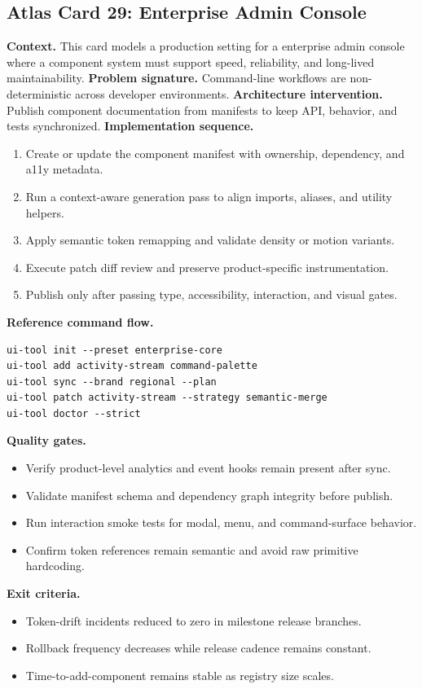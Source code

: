\subsection*{Atlas Card 29: Enterprise Admin Console}
\textbf{Context.} This card models a production setting for a enterprise admin console where a component system must support speed, reliability, and long-lived maintainability.
\textbf{Problem signature.} Command-line workflows are non-deterministic across developer environments.
\textbf{Architecture intervention.} Publish component documentation from manifests to keep API, behavior, and tests synchronized.
\textbf{Implementation sequence.}
\begin{enumerate}[leftmargin=*, itemsep=0.28em]
  \item Create or update the component manifest with ownership, dependency, and a11y metadata.
  \item Run a context-aware generation pass to align imports, aliases, and utility helpers.
  \item Apply semantic token remapping and validate density or motion variants.
  \item Execute patch diff review and preserve product-specific instrumentation.
  \item Publish only after passing type, accessibility, interaction, and visual gates.
\end{enumerate}
\textbf{Reference command flow.}
\begin{verbatim}
ui-tool init --preset enterprise-core
ui-tool add activity-stream command-palette
ui-tool sync --brand regional --plan
ui-tool patch activity-stream --strategy semantic-merge
ui-tool doctor --strict
\end{verbatim}
\textbf{Quality gates.}
\begin{itemize}[leftmargin=*, itemsep=0.24em]
  \item Verify product-level analytics and event hooks remain present after sync.
  \item Validate manifest schema and dependency graph integrity before publish.
  \item Run interaction smoke tests for modal, menu, and command-surface behavior.
  \item Confirm token references remain semantic and avoid raw primitive hardcoding.
\end{itemize}
\textbf{Exit criteria.}
\begin{itemize}[leftmargin=*, itemsep=0.24em]
  \item Token-drift incidents reduced to zero in milestone release branches.
  \item Rollback frequency decreases while release cadence remains constant.
  \item Time-to-add-component remains stable as registry size scales.
\end{itemize}
\clearpage
